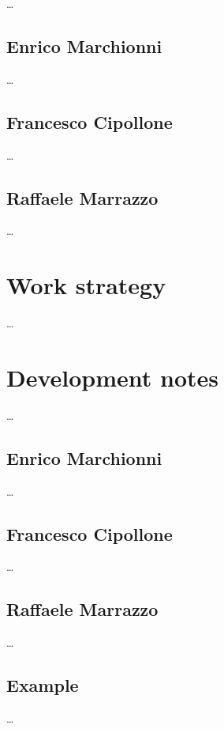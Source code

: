 \documentclass[12pt, a4paper]{report}
\begin{document}
    \dots

    \subsection*{Enrico Marchionni}

    \dots

    \subsection*{Francesco Cipollone}

    \dots

    \subsection*{Raffaele Marrazzo}

    \dots

\section{Work strategy}

    \dots

\section{Development notes}

    \dots

    \subsection*{Enrico Marchionni}

    \dots

    \subsection*{Francesco Cipollone}

    \dots

    \subsection*{Raffaele Marrazzo}

    \dots

\subsection{Example}

    \dots
\end{document}
